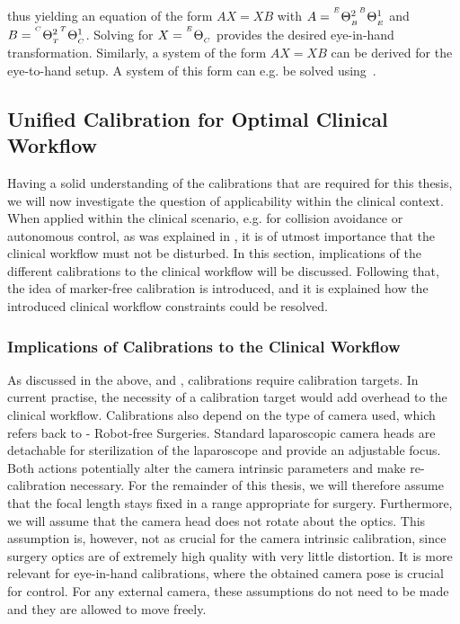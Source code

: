 thus yielding an equation of the form $AX = XB$ with $A={}^{^E}\Theta_{_B}^{2}{}^{^B}\Theta_{_E}^{1}$ and $B={}^{^C}\Theta_{_T}^{2}{}^{^T}\Theta_{_C}^{1}$. Solving for $X={}^{^E}\Theta_{_C}$ provides the desired eye-in-hand transformation. Similarly, a system of the form $AX = XB$ can be derived for the eye-to-hand setup. A system of this form can e.g. be solved using~\cite{tsai1989new, park1994robot, Horaud95}.


\subsection{Unified Calibration for Optimal Clinical Workflow}
\label{in:sec:unified_calibration}
Having a solid understanding of the calibrations that are required for this thesis, we will now investigate the question of applicability within the clinical context. When applied within the clinical scenario, e.g. for collision avoidance or autonomous control, as was explained in , it is of utmost importance that the clinical workflow must not be disturbed. In this section, implications of the different calibrations to the clinical workflow will be discussed. Following that, the idea of marker-free calibration is introduced, and it is explained how the introduced clinical workflow constraints could be resolved.

\subsubsection{Implications of Calibrations to the Clinical Workflow}
As discussed in the above,  and , calibrations require calibration targets. In current practise, the necessity of a calibration target would add overhead to the clinical workflow. Calibrations also depend on the type of camera used, which refers back to  - Robot-free Surgeries. Standard laparoscopic camera heads are detachable for sterilization of the laparoscope and provide an adjustable focus. Both actions potentially alter the camera intrinsic parameters and make re-calibration necessary. For the remainder of this thesis, we will therefore assume that the focal length stays fixed in a range appropriate for surgery. Furthermore, we will assume that the camera head does not rotate about the optics. This assumption is, however, not as crucial for the camera intrinsic calibration, since surgery optics are of extremely high quality with very little distortion. It is more relevant for eye-in-hand calibrations, where the obtained camera pose is crucial for control. For any external camera, these assumptions do not need to be made and they are allowed to move freely.

